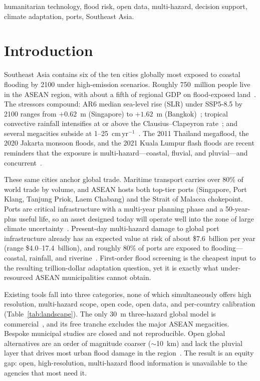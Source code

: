 \documentclass[conference]{IEEEtran}
\begin{document}
\begin{IEEEkeywords}
humanitarian technology, flood risk, open data, multi-hazard, decision support, climate adaptation, ports, Southeast Asia.
\end{IEEEkeywords}

\section{Introduction}
Southeast Asia contains six of the ten cities globally most exposed to coastal flooding by 2100 under high-emission scenarios. Roughly 750~million people live in the ASEAN region, with about a fifth of regional GDP on flood-exposed land~\cite{adb2022}. The stressors compound: AR6 median sea-level rise (SLR) under SSP5-8.5 by 2100 ranges from $+0.62$~m (Singapore) to $+1.62$~m (Bangkok)~\cite{ar6}; tropical convective rainfall intensifies at or above the Clausius--Clapeyron rate~\cite{lenderink2017}; and several megacities subside at 1--25~cm\,yr$^{-1}$~\cite{chaussard2013,abidin2011,phienwej2006}. The 2011 Thailand megaflood, the 2020 Jakarta monsoon floods, and the 2021 Kuala Lumpur flash floods are recent reminders that the exposure is multi-hazard---coastal, fluvial, and pluvial---and concurrent~\cite{hallegatte2013,tellman2021}.

These same cities anchor global trade. Maritime transport carries over 80\% of world trade by volume, and ASEAN hosts both top-tier ports (Singapore, Port Klang, Tanjung Priok, Laem Chabang) and the Strait of Malacca chokepoint. Ports are critical infrastructure with a multi-year planning phase and a 50-year-plus useful life, so an asset designed today will operate well into the zone of large climate uncertainty~\cite{jpm_seachange,hanson2020}. Present-day multi-hazard damage to global port infrastructure already has an expected value at risk of about \$7.6~billion per year (range \$4.0--17.4~billion), and roughly 80\% of ports are exposed to flooding---coastal, rainfall, and riverine~\cite{verschuur2023}. First-order flood screening is the cheapest input to the resulting trillion-dollar adaptation question, yet it is exactly what under-resourced ASEAN municipalities cannot obtain.

Existing tools fall into three categories, none of which simultaneously offers high resolution, multi-hazard scope, open code, open data, and per-country calibration (Table~\ref{tab:landscape}). The only 30~m three-hazard global model is commercial~\cite{wing2024}, and its free tranche excludes the major ASEAN megacities. Bespoke municipal studies are closed and not reproducible. Open global alternatives are an order of magnitude coarser ($\sim$10~km) and lack the pluvial layer that drives most urban flood damage in the region~\cite{hofste2019,ward2020,sutanudjaja2018}. The result is an equity gap: open, high-resolution, multi-hazard flood information is unavailable to the agencies that most need it.
\end{document}

